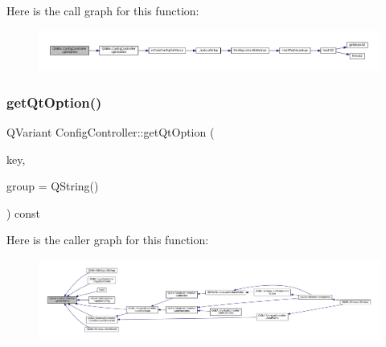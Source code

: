 Here is the call graph for this function\+:
\nopagebreak
\begin{figure}[H]
\begin{center}
\leavevmode
\includegraphics[width=350pt]{class_q_g_b_a_1_1_config_controller_a896df6163b258ee10856c3c7c5272fd7_cgraph}
\end{center}
\end{figure}
\mbox{\label{class_q_g_b_a_1_1_config_controller_abc071c2df876fa323690827538b83756}} 
\subsubsection{\texorpdfstring{get\+Qt\+Option()}{getQtOption()}}
{\footnotesize\ttfamily Q\+Variant Config\+Controller\+::get\+Qt\+Option (\begin{DoxyParamCaption}\item[{const Q\+String \&}]{key,  }\item[{const Q\+String \&}]{group = {\ttfamily QString()} }\end{DoxyParamCaption}) const}

Here is the caller graph for this function\+:
\nopagebreak
\begin{figure}[H]
\begin{center}
\leavevmode
\includegraphics[width=350pt]{class_q_g_b_a_1_1_config_controller_abc071c2df876fa323690827538b83756_icgraph}
\end{center}
\end{figure}
\mbox{\label{class_q_g_b_a_1_1_config_controller_a301b9fdaa174ea02f2a04d8be86a80c4}} 
